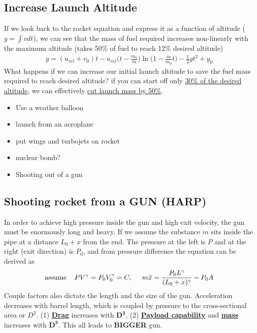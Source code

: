 \documentclass[a4paper,10pt]{article}
\begin{document}
\subsection{Increase Launch Altitude}
If we look back to the rocket equation and express it as a function of altitude ($y=\int vdt$), we can see that the mass of fuel required increases non-linearly with the maximum altitude (takes 50\% of fuel to reach 12\% desired altitude)
\begin{gather*}
    y = (u_{rel}+v_0)t-u_{rel}\Bigg(t-\frac{m_0}{\dot{m}}\Bigg)\ln\Bigg(1-\frac{\dot{m}}{m_0}t\Bigg)-\frac{1}{2}gt^2+y_0
\end{gather*}
What happens if we can increase our initial launch altitude to save the fuel mass required to reach desired altitude? if you can start off only \underline{30\% of the desired altitude}, we can effectively \underline{cut launch mass by 50\%}.

\begin{multicols}{3}
\begin{itemize}
    \item Use a weather balloon
    \item launch from an aeroplane
    \item put wings and turbojets on rocket
    \item nuclear bomb?
    \item Shooting out of a gun
\end{itemize}
\end{multicols}

\subsection{Shooting rocket from a GUN (HARP)}
In order to achieve high pressure inside the gun and high exit velocity, the gun must be enormously long and heavy. If we assume the substance $m$ sits inside the pipe at a distance $L_0+x$ from the end. The pressure at the left is $P$ and at the right (exit direction) is $P_0$, and from pressure difference the equation can be derived as 
\begin{gather*}
    \text{assume}\hspace*{0.4cm}PV^\gamma = P_0V_0^\gamma = C,\hspace*{0.5cm}m\ddot{x} = \frac{P_0L^\gamma}{(L_0+x)^\gamma}-P_0A
\end{gather*} 
Couple factors also dictate the length and the size of the gun. Acceleration decreases with barrel length, which is coupled by pressure to the cross-sectional area or $D^2$. (1) \underline{\textbf{Drag}} increases with $\pmb{D^2}$, (2) \underline{\textbf{Payload capability}} and \underline{\textbf{mass}} increases with $\pmb{D^3}$. This all leads to \textbf{BIGGER} gun. 
\end{document}

